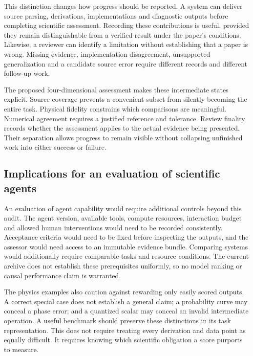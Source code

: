 \documentclass[10pt,a4paper]{article}
\begin{document}
This distinction changes how progress should be reported. A system can
deliver source parsing, derivations, implementations and diagnostic
outputs before completing scientific assessment. Recording these
contributions is useful, provided they remain distinguishable from a
verified result under the paper's conditions. Likewise, a reviewer can
identify a limitation without establishing that a paper is wrong.
Missing evidence, implementation disagreement, unsupported
generalization and a candidate source error require different records
and different follow-up work.

The proposed four-dimensional assessment makes these intermediate states
explicit. Source coverage prevents a convenient subset from silently
becoming the entire task. Physical fidelity constrains which comparisons
are meaningful. Numerical agreement requires a justified reference and
tolerance. Review finality records whether the assessment applies to the
actual evidence being presented. Their separation allows progress to
remain visible without collapsing unfinished work into either success or
failure.

\subsection{Implications for an evaluation of scientific
agents}\label{implications-for-an-evaluation-of-scientific-agents}

An evaluation of agent capability would require additional controls
beyond this audit. The agent version, available tools, compute
resources, interaction budget and allowed human interventions would need
to be recorded consistently. Acceptance criteria would need to be fixed
before inspecting the outputs, and the assessor would need access to an
immutable evidence bundle. Comparing systems would additionally require
comparable tasks and resource conditions. The current archive does not
establish these prerequisites uniformly, so no model ranking or causal
performance claim is warranted.

The physics examples also caution against rewarding only easily scored
outputs. A correct special case does not establish a general claim; a
probability curve may conceal a phase error; and a quantized scalar may
conceal an invalid intermediate operation. A useful benchmark should
preserve these distinctions in its task representation. This does not
require treating every derivation and data point as equally difficult.
It requires knowing which scientific obligation a score purports to
measure.
\end{document}

